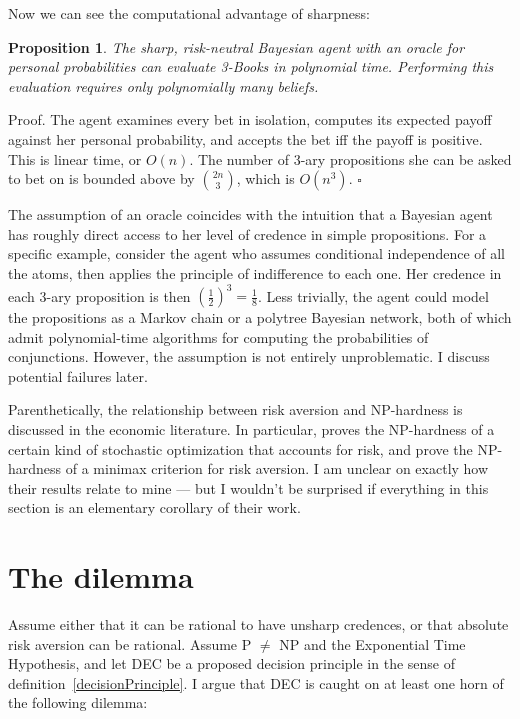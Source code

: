 \documentclass[letterpaper,12pt]{article}
\newtheorem{proposition}{Proposition}
\begin{document}
Now we can see the computational advantage of sharpness:

\begin{proposition}
\label{sharpEUMP}
The sharp, risk-neutral Bayesian agent with an oracle for personal probabilities can evaluate 3-Books in polynomial time. Performing this evaluation requires only polynomially many beliefs.
\end{proposition}

Proof. The agent examines every bet in isolation, computes its expected payoff against her personal probability, and accepts the bet iff the payoff is positive. This is linear time, or $O(n)$. The number of 3-ary propositions she can be asked to bet on is bounded above by $\binom{2n}{3}$, which is $O(n^3)$. $\square$

The assumption of an oracle coincides with the intuition that a Bayesian agent has roughly direct access to her level of credence in simple propositions. For a specific example, consider the agent who assumes conditional independence of all the atoms, then applies the principle of indifference to each one. Her credence in each 3-ary proposition is then $(\frac{1}{2})^3 = \frac{1}{8}$. Less trivially, the agent could model the propositions as a Markov chain or a polytree Bayesian network, both of which  admit polynomial-time algorithms for computing the probabilities of conjunctions. However, the assumption is not entirely unproblematic. I discuss potential failures later.

Parenthetically, the relationship between risk aversion and NP-hardness is discussed in the economic literature. In particular, \cite{DBLP:journals/mp/Ahmed06} proves the NP-hardness of a certain kind of stochastic optimization that accounts for risk, and \cite{DBLP:journals/mor/BertsimasDNT10} prove the NP-hardness of a minimax criterion for risk aversion. I am unclear on exactly how their results relate to mine --- but I wouldn't be surprised if everything in this section is an elementary corollary of their work.

\section{The dilemma}
\label{dilemmaSection}
Assume either that it can be rational to have unsharp credences, or that absolute risk aversion can be rational. Assume P $\not =$ NP and the Exponential Time Hypothesis, and let DEC be a proposed decision principle in the sense of definition~\ref{decisionPrinciple}. I argue that DEC is caught on at least one horn of the following dilemma:
\end{document}
